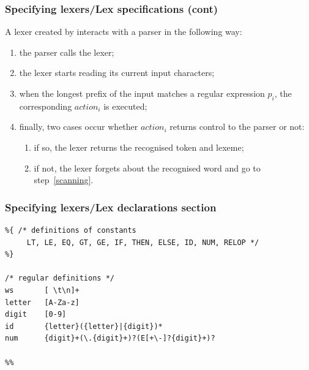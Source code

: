 %
\begin{frame}
\frametitle{Specifying lexers/Lex specifications (cont)}

A lexer created by \Lex interacts with a parser in the following way:
\begin{enumerate}

  \item the parser calls the lexer;

  \item the lexer starts reading its current input
  characters; \label{scanning}

  \item when the longest prefix of the input matches a regular
    expression \(p_i\), the corresponding \(\textit{action}_i\) is
    executed;

  \item finally, two cases occur whether \(\textit{action}_i\) returns
    control to the parser or not:
    \begin{enumerate}

      \item if so, the lexer returns the recognised token and lexeme;

      \item if not, the lexer forgets about the recognised word and
      go to step~\ref{scanning}.

    \end{enumerate}

\end{enumerate}

\end{frame}

%
\begin{frame}[containsverbatim]
\frametitle{Specifying lexers/Lex declarations section}

{\small
\begin{verbatim}
%{ /* definitions of constants
     LT, LE, EQ, GT, GE, IF, THEN, ELSE, ID, NUM, RELOP */
%}

/* regular definitions */
ws       [ \t\n]+
letter   [A-Za-z]
digit    [0-9]
id       {letter}({letter}|{digit})*
num      {digit}+(\.{digit}+)?(E[+\-]?{digit}+)?

%%
\end{verbatim}
}

\end{frame}

